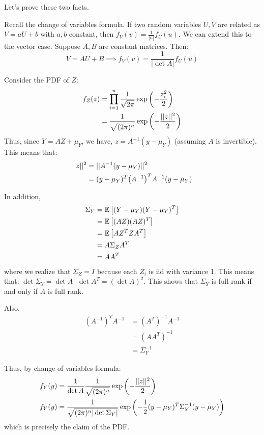 Let's prove these two facts.
\begin{proof*}
    Recall the change of variables formula. If two random variables $U, V$ are related as $V = aU + b$ with $a, b$ constant,
    then $f_V(v) = \frac{1}{|a|} f_U(u)$. We can extend this to the vector case. Suppose $A, B$ are constant matrices. Then:
    \[ V = AU + B \implies f_V(v) = \frac{1}{|\det A|} f_U(u) \]

    Consider the PDF of $Z$:
    \begin{align*}
        f_Z(z) &= \prod_{i = 1}^n \frac{1}{\sqrt{2\pi}} \exp\qty(-\frac{z_i^2}{2}) \\
        &= \frac{1}{\sqrt{(2\pi)^n}} \exp\qty(-\frac{||z||^2}{2}) \\
    \end{align*}
    Thus, since $Y = AZ + \mu_Y$, we have, $z = A^{-1} (y - \mu_Y)$ (assuming $A$ is invertible). This means that:
    \begin{align*}
        ||z||^2 &= ||A^{-1}(y - \mu_Y)||^2 \\
        &= (y - \mu_Y)^T \qty(A^{-1})^T A^{-1} (y - \mu_Y) \\
    \end{align*}

    In addition,
    \begin{align*}
        \Sigma_Y &= \mathbb{E}\left[ (Y - \mu_Y) (Y - \mu_Y)^T \right] \\
        &= \mathbb{E}\left[ (AZ) (AZ)^T \right] \\
        &= \mathbb{E}\left[ A Z^T Z A^T \right] \\
        &= A \Sigma_Z A^T \\
        &= A A^T \\
    \end{align*}
    where we realize that $\Sigma_Z = I$ because each $Z_i$ is iid with variance 1. This means that:
    $\det \Sigma_Y = \det A \cdot \det A^T = (\det A)^2$. This shows that $\Sigma_Y$ is full rank if and only if $A$ is full rank.

    Also, 
    \begin{align*}
        (A^{-1})^T A^{-1} &= (A^T)^{-1} A^{-1} \\
        &= (AA^T)^{-1} \\
        &= \Sigma_Y^{-1}
    \end{align*}

    Thus, by change of variables formula:
    \begin{align*}
        f_Y(y) &= \frac{1}{\det A} \frac{1}{\sqrt{(2\pi)^n}} \exp\qty(-\frac{||z||^2}{2}) \\
        f_Y(y) &= \frac{1}{\sqrt{(2\pi)^n |\det \Sigma_Y|}} \exp\qty(-\frac{1}{2} (y - \mu_Y)^T \Sigma_Y^{-1} (y - \mu_Y))
    \end{align*}
    which is precisely the claim of the PDF.
\end{proof*}

